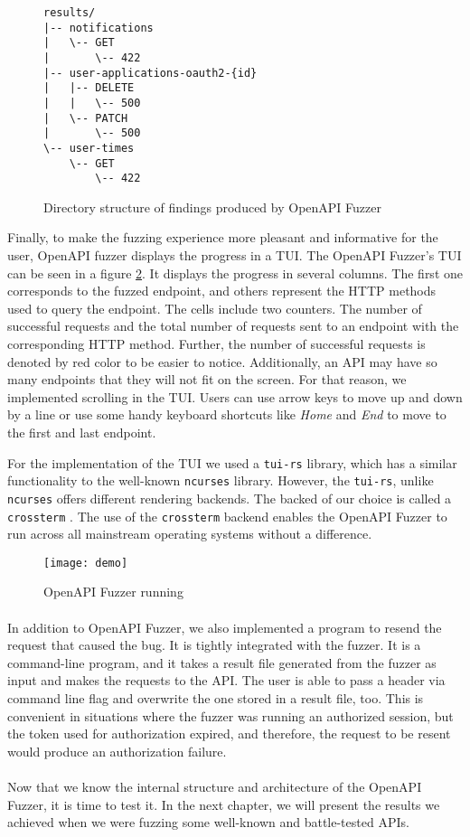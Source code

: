 \begin{figure}[h]
\begin{verbatim}
results/
|-- notifications
|   \-- GET
|       \-- 422
|-- user-applications-oauth2-{id}
|   |-- DELETE
|   |   \-- 500
|   \-- PATCH
|       \-- 500
\-- user-times
    \-- GET
        \-- 422
\end{verbatim}
\caption{Directory structure of findings produced by OpenAPI Fuzzer}
\label{fig:openapi-fuzzer-results}
\end{figure}

Finally, to make the fuzzing experience more pleasant and informative for the user, OpenAPI fuzzer displays the progress in a TUI. The OpenAPI Fuzzer's TUI can be seen in a figure \ref{fig:openapi-fuzzer-run}. It displays the progress in several columns. The first one corresponds to the fuzzed endpoint, and others represent the HTTP methods used to query the endpoint. The cells include two counters. The number of successful requests and the total number of requests sent to an endpoint with the corresponding HTTP method. Further, the number of successful requests is denoted by red color to be easier to notice. Additionally, an API may have so many endpoints that they will not fit on the screen. For that reason, we implemented scrolling in the TUI. Users can use arrow keys to move up and down by a line or use some handy keyboard shortcuts like \textit{Home} and \textit{End} to move to the first and last endpoint.

For the implementation of the TUI we used a \texttt{tui-rs} \cite{tuirs2020github} library, which has a similar functionality to the well-known \texttt{ncurses} library. However, the \texttt{tui-rs}, unlike \texttt{ncurses} offers different rendering backends. The backed of our choice is called a \texttt{crossterm} \cite{crossterm2020github}. The use of the \texttt{crossterm} backend enables the OpenAPI Fuzzer to run across all mainstream operating systems without a difference.

\begin{figure}
\texttt{[image: demo]}
\caption{OpenAPI Fuzzer running}
\label{fig:openapi-fuzzer-run}
\end{figure}

\paragraph{}
In addition to OpenAPI Fuzzer, we also implemented a program to resend the request that caused the bug. It is tightly integrated with the fuzzer. It is a command-line program, and it takes a result file generated from the fuzzer as input and makes the requests to the API. The user is able to pass a header via command line flag and overwrite the one stored in a result file, too. This is convenient in situations where the fuzzer was running an authorized session, but the token used for authorization expired, and therefore, the request to be resent would produce an authorization failure.

\paragraph{}
Now that we know the internal structure and architecture of the OpenAPI Fuzzer, it is time to test it. In the next chapter, we will present the results we achieved when we were fuzzing some well-known and battle-tested APIs.
